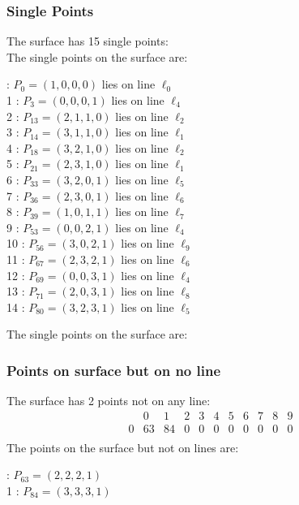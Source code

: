 \documentclass{article}
\begin{document}
{\subsubsection*{Single Points}
The surface has 15 single points:\\
The single points on the surface are:\\
\begin{multicols}{2}
 : $P_{0}=( 1, 0, 0, 0 )$ lies on line $\ell_{0}$\\
1 : $P_{3}=( 0, 0, 0, 1 )$ lies on line $\ell_{4}$\\
2 : $P_{13}=( 2, 1, 1, 0 )$ lies on line $\ell_{2}$\\
3 : $P_{14}=( 3, 1, 1, 0 )$ lies on line $\ell_{1}$\\
4 : $P_{18}=( 3, 2, 1, 0 )$ lies on line $\ell_{2}$\\
5 : $P_{21}=( 2, 3, 1, 0 )$ lies on line $\ell_{1}$\\
6 : $P_{33}=( 3, 2, 0, 1 )$ lies on line $\ell_{5}$\\
7 : $P_{36}=( 2, 3, 0, 1 )$ lies on line $\ell_{6}$\\
8 : $P_{39}=( 1, 0, 1, 1 )$ lies on line $\ell_{7}$\\
9 : $P_{53}=( 0, 0, 2, 1 )$ lies on line $\ell_{4}$\\
10 : $P_{56}=( 3, 0, 2, 1 )$ lies on line $\ell_{9}$\\
11 : $P_{67}=( 2, 3, 2, 1 )$ lies on line $\ell_{6}$\\
12 : $P_{69}=( 0, 0, 3, 1 )$ lies on line $\ell_{4}$\\
13 : $P_{71}=( 2, 0, 3, 1 )$ lies on line $\ell_{8}$\\
14 : $P_{80}=( 3, 2, 3, 1 )$ lies on line $\ell_{5}$\\
\end{multicols}
The single points on the surface are:\\
\subsubsection*{Points on surface but on no line}
The surface has 2 points not on any line:\\
$$
\begin{array}{r|*{10}{r}}
 & 0 & 1 & 2 & 3 & 4 & 5 & 6 & 7 & 8 & 9\\
\hline
0 & 63 & 84 & 0 & 0 & 0 & 0 & 0 & 0 & 0 & 0\\
\end{array}
$$
The points on the surface but not on lines are:\\
\begin{multicols}{2}
 : $P_{63}=( 2, 2, 2, 1 )$\\
1 : $P_{84}=( 3, 3, 3, 1 )$\\
\end{multicols}
}
\end{document}
